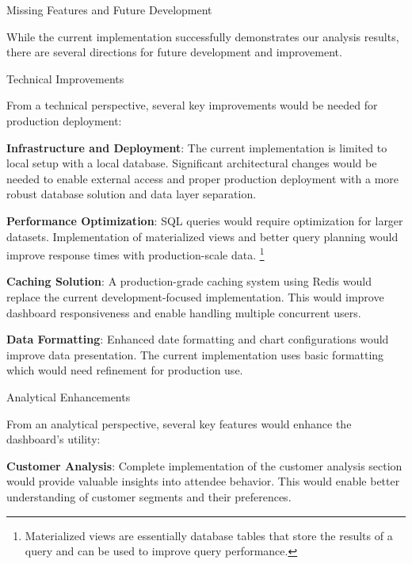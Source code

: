 \begin{section}{Missing Features and Future Development}
	\label{sec:future-development}

	While the current implementation successfully demonstrates our analysis results, there are several directions for future development and improvement.

	\begin{subsection}{Technical Improvements}
		\label{subsec:future-technical}

		From a technical perspective, several key improvements would be needed for production deployment:

		\textbf{Infrastructure and Deployment}: The current implementation is limited to local setup with a local database.
		Significant architectural changes would be needed to enable external access and proper production deployment with a more robust database solution and data layer separation.

		\textbf{Performance Optimization}: SQL queries would require optimization for larger datasets.
		Implementation of materialized views and better query planning would improve response times with production-scale data.
		\footnote{Materialized views are essentially database tables that store the results of a query and can be used to improve query performance\cite{tpgdg_current_rules_materializedviews}.}

		\textbf{Caching Solution}: A production-grade caching system using Redis would replace the current development-focused implementation.
		This would improve dashboard responsiveness and enable handling multiple concurrent users.

		\textbf{Data Formatting}: Enhanced date formatting and chart configurations would improve data presentation.
		The current implementation uses basic formatting which would need refinement for production use.
	\end{subsection}

	\begin{subsection}{Analytical Enhancements}
		\label{subsec:future-analytical}

		From an analytical perspective, several key features would enhance the dashboard's utility:

		\textbf{Customer Analysis}: Complete implementation of the customer analysis section would provide valuable insights into attendee behavior.
		This would enable better understanding of customer segments and their preferences.


\end{subsection}
\end{section}
